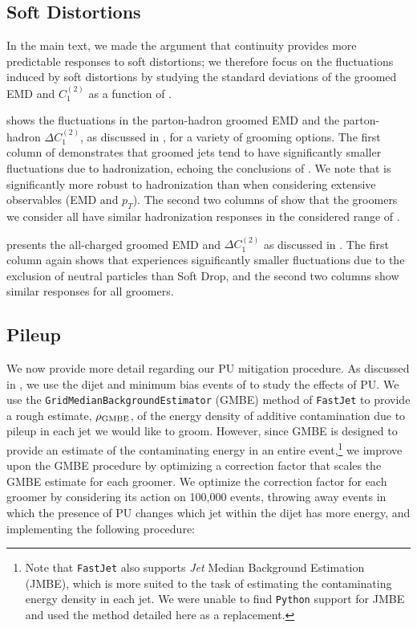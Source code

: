 \documentclass[letterpaper,11pt]{article}
\begin{document}
\subsection{Soft Distortions}
In the main text, we made the argument that continuity provides more predictable responses to soft distortions;
%
we therefore focus on the fluctuations induced by soft distortions by studying the standard deviations of the groomed EMD and \(C_1^{(2)}\) as a function of \zcut.

 shows the fluctuations in the parton-hadron groomed EMD and the parton-hadron \(\Delta C_1^{(2)}\), as discussed in , for a variety of grooming options.
%
The first column of  demonstrates that  groomed jets tend to have significantly smaller fluctuations due to hadronization, echoing the conclusions of .
%
We note that  is significantly more robust to hadronization than  when considering extensive observables (EMD and \(p_T\)).
%
The second two columns of  show that the \PIRANHA{} groomers we consider all have similar hadronization responses in the considered range of \zcut.

 presents the all-charged groomed EMD and \(\Delta C_1^{(2)}\) as discussed in .
%
The first column again shows that  experiences significantly smaller fluctuations due to the exclusion of neutral particles than Soft Drop, and the second two columns show similar responses for all \PIRANHA{} groomers.


\subsection{Pileup}
\label{app:pufrenzy}

We now provide more detail regarding our PU mitigation procedure.
%
As discussed in , we use the dijet and minimum bias events of  to study the effects of PU.
%
We use the \texttt{GridMedianBackgroundEstimator} (GMBE) method of \texttt{FastJet} \cite{Cacciari:2011ma} to provide a rough estimate, \(\rho_{\rm GMBE}\), of the energy density of additive contamination due to pileup in each jet we would like to groom.
%
However, since GMBE is designed to provide an estimate of the contaminating energy in an entire event,\footnote{
Note that \texttt{FastJet} also supports \textit{Jet} Median Background Estimation (JMBE), which is more suited to the task of estimating the contaminating energy density in each jet.
%
We were unable to find \texttt{Python} support for JMBE and used the method detailed here as a replacement.
} we improve upon the GMBE procedure by optimizing a correction factor that scales the GMBE estimate for each groomer.
%
We optimize the correction factor for each groomer by considering its action on 100,000 events, throwing away events in which the presence of PU changes which jet within the dijet has more energy, and implementing the following procedure:
\end{document}
